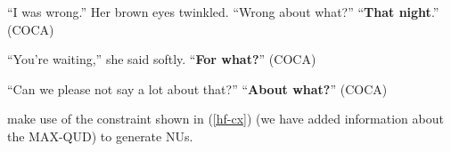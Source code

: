 \documentclass[output=paper
                ,modfonts
                ,nonflat
	        ,collection
	        ,collectionchapter
	        ,collectiontoclongg
 	        ,biblatex
                ,babelshorthands
                ,newtxmath
                ,draftmode
                ,colorlinks, citecolor=brown
]{./langsci/langscibook}
\begin{document}
{\ea ``I was wrong.'' Her brown eyes twinkled. ``Wrong about what?'' ``\textbf{That night}.'' (COCA) \label{34a}\z

\ea ``You're waiting,'' she said softly. ``\textbf{For what?}'' (COCA) \label{35} \z

\ea ``Can we please not say a lot about that?'' ``\textbf{About what?}'' (COCA) \label{36} \z

\citet[304]{Ginzburg2000} make use of the constraint shown in (\ref{hf-cx}) (we have added information about the MAX-QUD) to generate NUs.




                                 }
\end{document}
